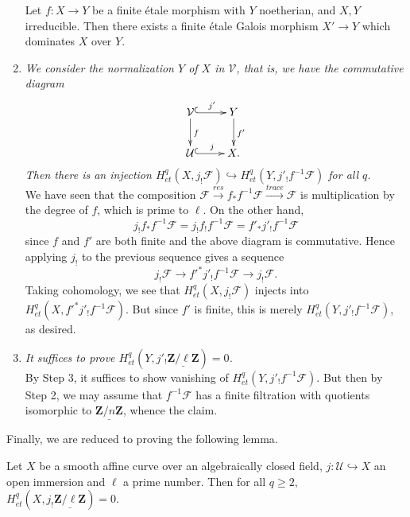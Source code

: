 \begin{enumerate}
\begin{exercise}
Let $f: X \to Y$ be a finite \'etale morphism with $Y$ noetherian, and $X, Y$ 
irreducible. Then there exists a finite \'etale Galois morphism $X' \to Y$ 
which dominates $X$ over $Y$.
\end{exercise}
\item
{\it We consider the normalization $Y$ of $X$ in $\mathcal{V}$, that is, we 
have the commutative diagram
$$
\xymatrix{
\mathcal{V} \ar^{f}[d] \ar^{j'}@{^{(}->}[r] & Y \ar^{f'}[d] \\
\mathcal{U} \ar^{j}@{^{(}->}[r] & X.
}
$$
Then there is an injection $H_{et}^q(X, j_!\mathcal{F}) \hookrightarrow 
H_{et}^q(Y, j'_! f^{-1} \mathcal{F})$ for all $q$.}
\\
We have seen that the composition $\mathcal{F} \xrightarrow{res} f_* f^{-1} 
\mathcal{F} \xrightarrow{trace} \mathcal{F}$ is multiplication by the degree of 
$f$, which is prime to $\ell$. On the other hand, 
$$
j_! f_* f^{-1} \mathcal{F} = j_! f_! f^{-1} \mathcal{F} = f'_* j'_! 
f^{-1}\mathcal{F}
$$ 
since $f$ and $f'$ are both finite and the above diagram is commutative. Hence 
applying $j_!$ to the previous sequence gives a sequence
$$
j_! \mathcal{F} \longrightarrow f'^* j'_! f^{-1} \mathcal{F} \longrightarrow 
j_! \mathcal{F}.
$$
Taking cohomology,  we see that  $H_{et}^q(X, j_!\mathcal{F})$ injects into 
$H_{et}^q( X , f'^* j'_! f^{-1} \mathcal{F})$. But since $f'$ is finite, this 
is merely $H_{et}^q( Y,  j'_! f^{-1} \mathcal{F})$, as desired.
\item
{\it It suffices to prove $H_{et}^q (Y, j'_! 
\underline{\mathbf{Z}/\ell\mathbf{Z}}) = 0$.}
\\
By Step 3, it suffices to show vanishing of $H_{et}^q( Y,  j'_! f^{-1} 
\mathcal{F})$. But then by Step 2, we may assume that $f^{-1}\mathcal{F}$ has a 
finite filtration with quotients isomorphic to 
$\underline{\mathbf{Z}/n\mathbf{Z}}$, whence the claim.
\end{enumerate}

Finally, we are reduced to proving the following lemma.

\begin{lemma} 
Let $X$ be a smooth affine curve over an algebraically closed field, $j: 
\mathcal{U} \hookrightarrow X$ an open immersion and $\ell$ a prime number. 
Then for all $q \geq 2$, $H_{et}^q(X, j_! 
\underline{\mathbf{Z}/\ell\mathbf{Z}}) = 0$.
\end{lemma}


